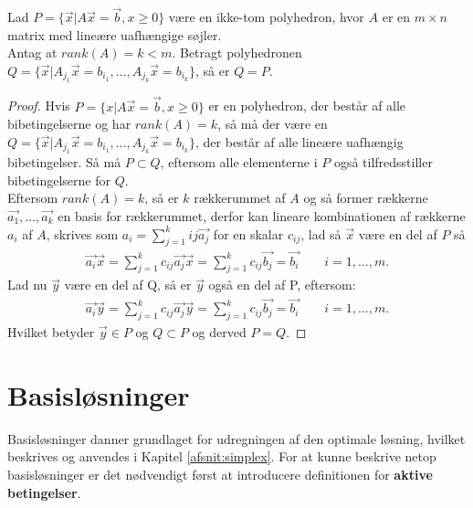 \begin{stn} 
Lad $P=\{\vec{x}|A\vec{x}=\vec{b},x\geq 0\}$ være en ikke-tom polyhedron, hvor $A$ er en $m\times n$ matrix med lineære uafhængige søjler.\\
Antag at $rank(A)=k<m$. Betragt polyhedronen $Q=\{\vec{x}|A_{j_1}\vec{x}=b_{i_1},\dots ,A_{j_k}\vec{x}=b_{i_k}\}$, så er $Q=P$.
\label{stn:PQ}
\end{stn}
\begin{proof}
Hvis $P=\{x|A\vec{x}=\vec{b},x\geq 0\}$ er en polyhedron, der består af alle bibetingelserne og har $rank(A)=k$, så må der være en $Q=\{\vec{x}|A_{j_1}\vec{x}=b_{i_1},\dots ,A_{j_k}\vec{x}=b_{i_k}\}$, der består af alle lineære uafhængig bibetingelser. Så må $P\subset Q$, eftersom alle elementerne i $P$ også tilfredsstiller bibetingelserne for $Q$.\\
Eftersom $rank(A)=k$, så er $k$ rækkerummet af $A$ og så former rækkerne $\vec{a_1},\dots ,\vec{a_k}$ en basis for rækkerummet, derfor kan lineare kombinationen af rækkerne $a_i$ af $A$, skrives som $a_i=\sum_{j=1}^{k}{i j}\vec{a_j}$ for en skalar $c_{i j}$, lad så $\vec{x}$ være en del af $P$ så
\begin{align*}
\vec{a_i}\vec{x}=\sum_{j=1}^{k}c_{i j}\vec{a_j}\vec{x}=\sum_{j=1}^{k}c_{i j}\vec{b_j}=\vec{b_i} \qquad i=1,\dots,m.
\end{align*}
Lad nu $\vec{y}$ være en del af Q, så er $\vec{y}$ også en del af P, eftersom:
\begin{align*}
\vec{a_i}\vec{y}=\sum_{j=1}^{k}c_{i j}\vec{a_j}\vec{y}=\sum_{j=1}^{k}c_{i j}\vec{b_j}=\vec{b_i} \qquad i=1,\dots,m.
\end{align*}
Hvilket betyder $\vec{y}\in P$ og $Q\subset P$ og derved $P=Q$.
\end{proof}

\section{Basisløsninger}


Basisløsninger danner grundlaget for udregningen af den optimale løsning, hvilket beskrives og anvendes i Kapitel \ref{afsnit:simplex}. For at kunne beskrive netop basisløsninger er det nødvendigt først at introducere definitionen for \textbf{aktive betingelser}.%

